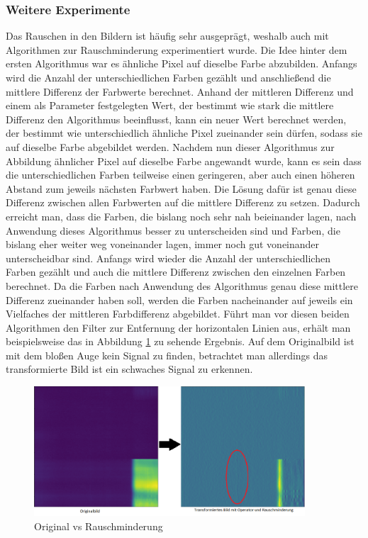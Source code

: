\documentclass[12pt, a4paper]{article}
\begin{document}
\subsubsection{Weitere Experimente}
Das Rauschen in den Bildern ist häufig sehr ausgeprägt, weshalb auch mit Algorithmen zur Rauschminderung experimentiert wurde. Die Idee hinter dem ersten Algorithmus war es ähnliche Pixel auf dieselbe Farbe abzubilden. Anfangs wird die Anzahl der unterschiedlichen Farben gezählt und anschließend die mittlere Differenz der Farbwerte berechnet. Anhand der mittleren Differenz und einem als Parameter festgelegten Wert, der bestimmt wie stark die mittlere Differenz den Algorithmus beeinflusst, kann ein neuer Wert berechnet werden, der bestimmt wie unterschiedlich ähnliche Pixel zueinander sein dürfen, sodass sie auf dieselbe Farbe abgebildet werden. 
\newline
Nachdem nun dieser Algorithmus zur Abbildung ähnlicher Pixel auf dieselbe Farbe angewandt wurde, kann es sein dass die unterschiedlichen Farben teilweise einen geringeren, aber auch einen höheren Abstand zum jeweils nächsten Farbwert haben. Die Lösung dafür ist genau diese Differenz zwischen allen Farbwerten auf die mittlere Differenz zu setzen. Dadurch erreicht man, dass die Farben, die bislang noch sehr nah beieinander lagen, nach Anwendung dieses Algorithmus besser zu unterscheiden sind und Farben, die bislang eher weiter weg voneinander lagen, immer noch gut voneinander unterscheidbar sind. Anfangs wird wieder die Anzahl der unterschiedlichen Farben gezählt und auch die mittlere Differenz zwischen den einzelnen Farben berechnet. Da die Farben nach Anwendung des Algorithmus genau diese mittlere Differenz zueinander haben soll, werden die Farben nacheinander auf jeweils ein Vielfaches der mittleren Farbdifferenz abgebildet.
\newline
Führt man vor diesen beiden Algorithmen den Filter zur Entfernung der horizontalen Linien aus, erhält man beispielsweise das in Abbildung \ref{fig:rausch} zu sehende Ergebnis. Auf dem Originalbild ist mit dem bloßen Auge kein Signal zu finden, betrachtet man allerdings das transformierte Bild ist ein schwaches Signal zu erkennen.
\begin{figure}[t]
\centering
\includegraphics[width=0.9\textwidth]{img/original-vs-rauschminderung.png}
\caption{Original vs Rauschminderung}
\label{fig:rausch}
\end{figure}
\newline
\end{document}
